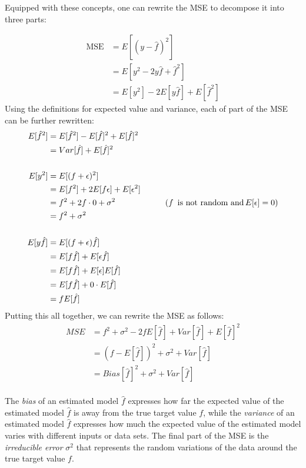 Equipped with these concepts, one can rewrite the MSE to decompose it into three parts:

\begin{align*}
\operatorname{MSE} &= E[(y - \hat{f})^2] \\
    & = E [ y^2 - 2 y \hat{f} + \hat{f}^2] \\
    &= E [y^2] - 2E[y\hat{f}] + E[\hat{f}^2]
\end{align*}
\noindent Using the definitions for expected value and variance, each of part of the MSE can be further rewritten:
\begin{align*}
E[\hat{f}^2] &= E[\hat{f}^2] - E[\hat{f}]^2 + E[\hat{f}]^2 \\
             &= Var[\hat{f}] + E[\hat{f}]^2 \\
\\
E[y^2] &= E[(f+\epsilon)^2] \\
       &= E[f^2] + 2E[f \epsilon] + E[\epsilon^2]\\
       &= f^2 + 2f \cdot 0 + \sigma^2 &\qquad (f \text{\, is not random and} \, E[\epsilon] = 0)\\
       &= f^2 + \sigma^2 \\ 
\\
E[y \hat{f}] &= E[(f + \epsilon)\hat{f}] \\
             &= E[f \hat{f}] + E[\epsilon \hat{f}] \\
             &= E[f \hat{f}] + E[\epsilon] E[\hat{f}] \\
             &= E[f \hat{f}] + 0 \cdot E[\hat{f}] \\
             &= f E[\hat{f}] \\
\end{align*}
\noindent Putting this all together, we can rewrite the MSE as follows:
\begin{align*}
MSE &= f^2 + \sigma^2 - 2 f E[\hat{f}] + Var[\hat{f}] + E[\hat{f}]^2 \\
    &= (f - E[\hat{f}])^2 + \sigma^2 + Var[\hat{f}] \\
    &= Bias[\hat{f}]^2 + \sigma^2 + Var[\hat{f}] \\
\end{align*}

The \emph{bias} of an estimated model $\hat{f}$ expresses how far the expected value of the estimated model $\hat{f}$ is away from the true target value $f$, while the \emph{variance} of an estimated model $\hat{f}$ expresses how much the expected value of the estimated model varies with different inputs or data sets. The final part of the MSE is the \emph{irreducible error} $\sigma^2$ that represents the random variations of the data around the true target value $f$.

